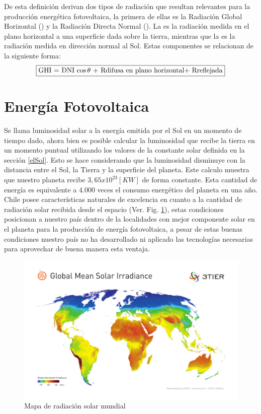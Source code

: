 De esta definición derivan dos tipos de radiación que resultan relevantes para la producción energética fotovoltaica, la primera de ellas es la Radiación Global Horizontal () y la Radiación Directa Normal (). La  es la radiación medida en el plano horizontal a una superficie dada sobre la tierra, mientras que la  es la radiación medida en dirección normal al Sol. Estas componentes se relacionan de la siguiente forma:
$$\fbox{GHI = DNI $\cos \theta$ + Rdifusa en plano horizontal+ Rreflejada}$$

\section{Energía Fotovoltaica}
Se llama luminosidad solar a la energía emitida por el Sol en un momento de tiempo dado, ahora bien es posible calcular la luminosidad que recibe la tierra en un momento puntual utilizando los valores de la constante solar definida en la sección \ref{elSol}. Esto se hace considerando que la luminosidad disminuye con la distancia entre el Sol, la Tierra y la superficie del planeta. Este calculo muestra que nuestro planeta recibe $3,65 x {10}^{23} [KW]$ de forma constante. Esta cantidad de energía es equivalente a 4.000 veces el consumo energético del planeta en una año.\\

Chile posee características naturales de excelencia en cuanto a la cantidad de radiación solar recibida desde el espacio (Ver. Fig. \ref{fig:mapaRadiacion}), estas condiciones posicionan a nuestro país dentro de la localidades con mejor componente solar en el planeta para la producción de energía fotovoltaica, a pesar de estas buenas condiciones nuestro país no ha desarrollado ni aplicado las tecnologías necesarias para aprovechar de buena manera esta ventaja.\\

\begin{figure}[h!]
        \centering
        \includegraphics[scale=0.3]{images/3tier_solar_irradiance}
        \caption{Mapa de radiación solar mundial\cite{3tier}}
        \label{fig:mapaRadiacion}
\end{figure}

